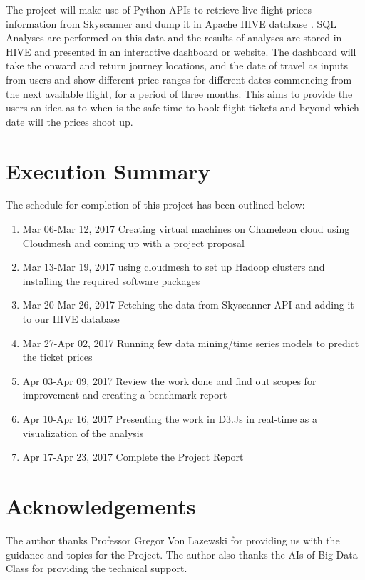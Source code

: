 \documentclass[9pt,twocolumn,twoside]{../../styles/osajnl}
\begin{document}
The project will make use of Python APIs to retrieve live flight prices information from Skyscanner and dump it in Apache HIVE database \cite{www-hive}. SQL Analyses are performed on this data and the results of analyses are stored in HIVE and presented in an interactive dashboard or website. The dashboard will take the onward and return journey locations, and the date of travel as inputs from users and show different price ranges for different dates commencing from the next available flight, for a period of three months. This aims to provide the users an idea as to when is the safe time to book flight tickets and beyond which date will the prices shoot up. 

\section{Execution Summary}
The schedule for completion of this project has been outlined below:
\begin{enumerate}
\item {Mar 06-Mar 12, 2017} Creating virtual machines on Chameleon cloud using Cloudmesh and coming up with a project proposal
\item {Mar 13-Mar 19, 2017} using cloudmesh to set up Hadoop clusters and installing the required software packages
\item {Mar 20-Mar 26, 2017} Fetching the data from Skyscanner API and adding it to our HIVE database
\item {Mar 27-Apr 02, 2017} Running few data mining/time series models to predict the ticket prices
\item {Apr 03-Apr 09, 2017} Review the work done and find out scopes for improvement and creating a benchmark report
\item {Apr 10-Apr 16, 2017} Presenting the work in D3.Js in real-time as a visualization of the analysis 
\item {Apr 17-Apr 23, 2017} Complete the Project Report
\end{enumerate}

\section*{Acknowledgements}

The author thanks Professor Gregor Von Lazewski for providing us with the guidance and topics for the Project. The author also thanks the AIs of Big Data Class for providing the technical
support.


\end{document}
